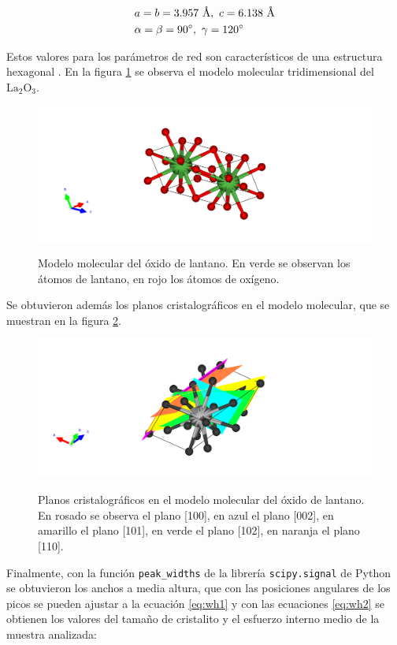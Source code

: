 \documentclass[final,5p,times,twocolumn, nopreprintline]{elsarticle}
\numberwithin{equation}{section}
\begin{document}
\begin{align*}
&a=b=3.957~\text{\r{A}},~c=6.138~\text{\r{A}}\\
&\alpha=\beta=90^\circ,~\gamma=120^\circ
\end{align*}

Estos valores para los parámetros de red son característicos de una estructura hexagonal \citep{kittel2018introduction}. En la figura \ref{fig:molecule} se observa el modelo molecular tridimensional del $\text{La}_2\text{O}_3$.


\begin{figure}[h!]
\centering
\includegraphics[width=0.8\columnwidth]{../4102405.pdf} \label{fig:molecule}
\caption{Modelo molecular del óxido de lantano. En verde se observan los átomos de lantano, en rojo los átomos de oxígeno.}
\end{figure}

Se obtuvieron además los planos cristalográficos en el modelo molecular, que se muestran en la figura \ref{fig:planes}.

\begin{figure}[h!]
\centering
\includegraphics[width=0.8\columnwidth]{../4102405_planes.pdf} \label{fig:planes}
\caption{Planos cristalográficos en el modelo molecular del óxido de lantano. En rosado se observa el plano [100], en azul el plano [002], en amarillo el plano [101], en verde el plano [102], en naranja el plano [110].}
\end{figure}

Finalmente, con la función \texttt{peak\_widths} de la librería \texttt{scipy.signal} de Python se obtuvieron los anchos a media altura, que con las posiciones angulares de los picos se pueden ajustar a la ecuación \ref{eq:wh1} y con las ecuaciones \ref{eq:wh2} se obtienen los valores del tamaño de cristalito y el esfuerzo interno medio de la muestra analizada:
\end{document}
